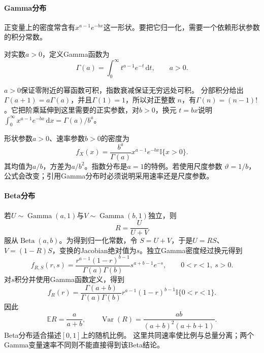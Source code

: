 \paragraph{Gamma分布}
正变量上的密度常含有\(x^{a-1}e^{-bx}\)这一形状。要把它归一化，需要一个依赖形状参数的积分常数。
\begin{definition}[Gamma函数]
  \label{def:probability-gamma-function}
对实数\(a>0\)，定义Gamma函数为
\begin{equation}
  \Gamma(a)=\int_0^\infty t^{a-1}e^{-t}\,\mathrm dt,
  \qquad a>0.
  \label{eq:probability-gamma-function}
\end{equation}
\end{definition}
\(a>0\)保证零附近的幂函数可积，指数衰减保证无穷远处可积。
分部积分给出\(\Gamma(a+1)=a\Gamma(a)\)，并且\(\Gamma(1)=1\)，所以对正整数
\(n\)，有\(\Gamma(n)=(n-1)!\)。它把阶乘延伸到这里需要的正实参数，对\(b>0\)，换元
\(t=bx\)说明\(\int_0^\infty x^{a-1}e^{-bx}\,\mathrm dx=\Gamma(a)/b^a\)。

形状参数\(a>0\)、速率参数\(b>0\)的密度为
\[ f_X(x)
  =\frac{b^a}{\Gamma(a)}x^{a-1}e^{-bx}\mathbb{I}\{x>0\}. \]
其均值为\(a/b\)，方差为\(a/b^2\)。指数分布是\(a=1\)的特例。若使用尺度参数
\(\vartheta=1/b\)，公式会改变；引用Gamma分布时必须说明采用速率还是尺度参数。

\paragraph{Beta分布}
若\(U\sim\operatorname{Gamma}(a,1)\)与\(V\sim\operatorname{Gamma}(b,1)\)独立，则
\[ R=\frac{U}{U+V} \]
服从\(\operatorname{Beta}(a,b)\)。为得到归一化常数，令
\(S=U+V\)，于是\(U=RS\)、\(V=(1-R)S\)，变换的Jacobian绝对值为\(s\)。独立Gamma密度经过换元得到
\[
  f_{R,S}(r,s)
  =
  \frac{r^{a-1}(1-r)^{b-1}}{\Gamma(a)\Gamma(b)}
  s^{a+b-1}e^{-s},
  \qquad 0<r<1,\ s>0.
\]
对\(s\)积分并使用Gamma函数定义，得到
\[
  f_R(r)
  =
  \frac{\Gamma(a+b)}{\Gamma(a)\Gamma(b)}
  r^{a-1}(1-r)^{b-1}\mathbb{I}\{0<r<1\}.
\]
因此
\[
  \mathbb{E}R=\frac{a}{a+b},\qquad
  \operatorname{Var}(R)=
  \frac{ab}{(a+b)^2(a+b+1)}.
\]
Beta分布适合描述\([0,1]\)上的随机比例。
这里共同速率使比例与总量分离；两个Gamma变量速率不同则不能直接得到该Beta结论。


